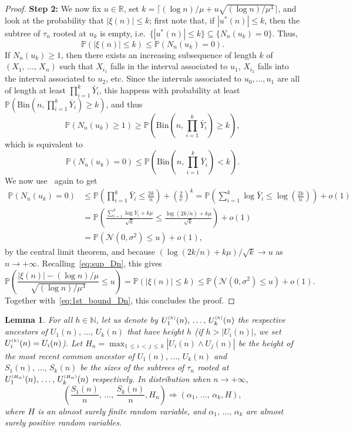\documentclass[10pt]{amsart}
\newtheorem{lemm}[theo]{Lemma}\newtheorem{prop}[theo]{Proposition}\newtheorem{coro}[theo]{Corollary}\newtheorem{conj}[theo]{Conjecture}
\theoremstyle{definition}\newtheorem{defi}[theo]{Definition}\newtheorem{rema}[theo]{Remark}\newtheorem{exam}[theo]{Example}\newtheorem{exem}[theo]{Example}\newtheorem{nota}[theo]{Notation}
\newcommand{\sss}{\ensuremath{\scriptscriptstyle}}
\newcommand{\bbP}{\mathbb{P}}
\newcommand{\bbN}{\mathbb{N}}
\newcommand{\bbR}{\mathbb{R}}
\newcommand{\clN}{\mathcal{N}}
\newcommand{\Bin}{\mathrm{Bin}}
\newcommand{\rme}{\mathrm{e}}
\begin{document}
\begin{proof}
{\bf Step 2:} We now fix $u\in\bbR$, set $k = \lceil(\log n)/\mu + u\sqrt{(\log n)/\mu^3}\rceil$, and look at the probability that $|\xi(n)|\leq k$; first note that, if $|u^*(n)| \leq k$, then the subtree of $\tau_n$ rooted at $u_k$ is empty, i.e.\ $\{|u^*(n)|\leq k\}\subseteq \{N_n(u_k)=0\}$. Thus,
\begin{equation}\label{eq:sup_Dn}
\bbP(|\xi(n)|\leq k)\leq \bbP(N_n(u_k)=0).
\end{equation}
If $N_n(u_k) \geq 1$, then there exists an increasing subsequence of length $k$ of $(X_1, \,\ldots,\, X_n)$ such that $X_{i_1}$ falls in the interval associated to $u_1$, $X_{i_2}$ falls into the interval associated to $u_2$, etc. Since the intervals associated to $u_0, \ldots, u_1$ are all of length at least $\prod_{i=1}^k \bar Y_i$, this happens with probability at least $\bbP(\Bin(n,\prod_{i=1}^k \bar Y_i)\geq k)$, and thus
\[
\bbP(N_n(u_k)\geq 1)
\geq \bbP\left(\Bin\left(n,\prod_{i=1}^k \bar Y_i\right)\geq k\right),
\]
which is equivalent to
\[
\bbP(N_n(u_k)=0) \leq \bbP\left(\Bin\left(n,\prod_{i=1}^k \bar Y_i\right)< k\right).
\]
We now use~\cite[Lemma~4]{devroye-split} again to get
\begin{align*}
\bbP(N_n(u_k)=0) &\leq \bbP\left(\prod_{i=1}^k \bar Y_i\leq \frac{2k}n\right)+\left(\frac2{\rme}\right)^k =\bbP\left(\sum_{i=1}^k \log \bar Y_i\leq \log\left(\frac{2k}n\right)\right)+o(1)\\
&= \bbP\left(\frac{\sum_{i=1}^k \log \bar Y_i+k\mu}{\sqrt{k}}\leq \frac{\log(2k/n)+k\mu}{\sqrt k}\right)+o(1)\\
&=\bbP(\clN(0,\sigma^2)\leq u)+o(1),
\end{align*}
by the central limit theorem, and because $(\log(2k/n)+k\mu)/\sqrt k\to u$ as $n\to+\infty$. Recalling~\eqref{eq:sup_Dn}, this gives
\[
\bbP\left(\frac{|\xi(n)|-(\log n)/\mu}{\sqrt{(\log n)/\mu^3}}\leq u\right)=\bbP(|\xi(n)|\leq k)
\leq \bbP(\clN(0,\sigma^2)\leq u)+o(1).
\]
Together with~\eqref{eq:1st_bound_Dn}, this concludes the proof.
\end{proof}

\begin{lemm}\label{lem:LCA}
For all $h\in \bbN$, let us denote by $U^{\sss (h)}_1(n), \,\ldots,\, U^{\sss (h)}_k(n)$ the respective ancestors of $U_1(n), \,\ldots,\, U_k(n)$ that have height $h$ (if $h>|U_i(n)|$, we set $U^{\sss (h)}_i(n)=U_i(n)$). Let $H_n=\max_{1\,\le\,i\,<\,j\,\le\,k} |U_i(n)\wedge U_j(n)|$ be the height of the most recent common ancestor of $U_1(n),\,\dots,\,U_k(n)$ and $S_1(n), \,\ldots, \,S_k(n)$ be the sizes of the subtrees of $\tau_n$ rooted at $U_1^{\sss (H_n)}(n), \,\ldots,\, U_k^{\sss (H_n)}(n)$ respectively. In distribution when $n\to+\infty$,
\[
\left(\frac{S_1(n)}n, \,\ldots,\, \frac{S_k(n)}n, H_n\right)
\Rightarrow (\alpha_1, \,\ldots,\, \alpha_k, H),
\]
where $H$ is an almost surely finite random variable, and $\alpha_1,\, \ldots,\, \alpha_k$ are almost surely positive random variables.
\end{lemm}
\end{document}
